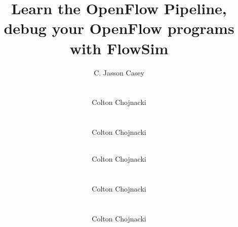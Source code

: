 \documentclass[conference]{sig-alternate}
\begin{document}
\title{Learn the OpenFlow Pipeline, debug your OpenFlow programs with FlowSim}

\author{
  \alignauthor C. Jasson Casey \\
       \\
       \\
  \alignauthor Colton Chojnacki \\
      \\
      \\
  \alignauthor Colton Chojnacki \\
     \\
\and
  \alignauthor Colton Chojnacki \\
     \\
    \\
  \alignauthor Colton Chojnacki \\
     \\
    \\
  \alignauthor Colton Chojnacki \\
     \\
}

\maketitle

\begin{abstract}
  
\end{abstract}

  
  
  
  
  
  
  
  
\end{document}
